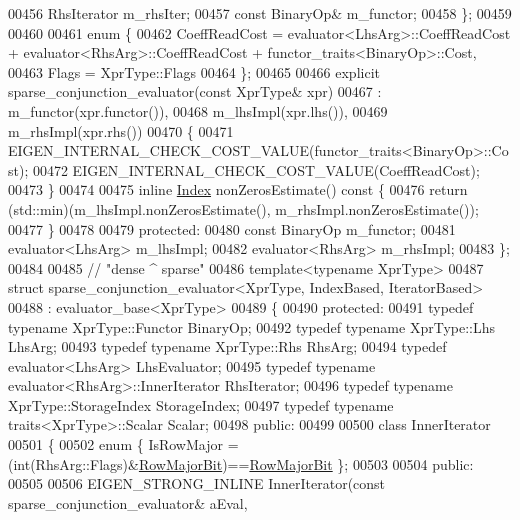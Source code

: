 \begin{DoxyCode}
00456     RhsIterator m\_rhsIter;
00457     \textcolor{keyword}{const} BinaryOp& m\_functor;
00458   \};
00459   
00460   
00461   \textcolor{keyword}{enum} \{
00462     CoeffReadCost = evaluator<LhsArg>::CoeffReadCost + evaluator<RhsArg>::CoeffReadCost + 
      functor\_traits<BinaryOp>::Cost,
00463     Flags = XprType::Flags
00464   \};
00465   
00466   \textcolor{keyword}{explicit} sparse\_conjunction\_evaluator(\textcolor{keyword}{const} XprType& xpr)
00467     : m\_functor(xpr.functor()),
00468       m\_lhsImpl(xpr.lhs()), 
00469       m\_rhsImpl(xpr.rhs())  
00470   \{
00471     EIGEN\_INTERNAL\_CHECK\_COST\_VALUE(functor\_traits<BinaryOp>::Cost);
00472     EIGEN\_INTERNAL\_CHECK\_COST\_VALUE(CoeffReadCost);
00473   \}
00474   
00475   \textcolor{keyword}{inline} \hyperlink{namespace_eigen_a62e77e0933482dafde8fe197d9a2cfde}{Index} nonZerosEstimate()\textcolor{keyword}{ const }\{
00476     \textcolor{keywordflow}{return} (std::min)(m\_lhsImpl.nonZerosEstimate(), m\_rhsImpl.nonZerosEstimate());
00477   \}
00478 
00479 \textcolor{keyword}{protected}:
00480   \textcolor{keyword}{const} BinaryOp m\_functor;
00481   evaluator<LhsArg> m\_lhsImpl;
00482   evaluator<RhsArg> m\_rhsImpl;
00483 \};
00484 
00485 \textcolor{comment}{// "dense ^ sparse"}
00486 \textcolor{keyword}{template}<\textcolor{keyword}{typename} XprType>
00487 \textcolor{keyword}{struct }sparse\_conjunction\_evaluator<XprType, IndexBased, IteratorBased>
00488   : evaluator\_base<XprType>
00489 \{
00490 \textcolor{keyword}{protected}:
00491   \textcolor{keyword}{typedef} \textcolor{keyword}{typename} XprType::Functor BinaryOp;
00492   \textcolor{keyword}{typedef} \textcolor{keyword}{typename} XprType::Lhs LhsArg;
00493   \textcolor{keyword}{typedef} \textcolor{keyword}{typename} XprType::Rhs RhsArg;
00494   \textcolor{keyword}{typedef} evaluator<LhsArg> LhsEvaluator;
00495   \textcolor{keyword}{typedef} \textcolor{keyword}{typename} evaluator<RhsArg>::InnerIterator  RhsIterator;
00496   \textcolor{keyword}{typedef} \textcolor{keyword}{typename} XprType::StorageIndex StorageIndex;
00497   \textcolor{keyword}{typedef} \textcolor{keyword}{typename} traits<XprType>::Scalar Scalar;
00498 \textcolor{keyword}{public}:
00499 
00500   \textcolor{keyword}{class }InnerIterator
00501   \{
00502     \textcolor{keyword}{enum} \{ IsRowMajor = (int(RhsArg::Flags)&\hyperlink{group__flags_gae4f56c2a60bbe4bd2e44c5b19cbe8762}{RowMajorBit})==\hyperlink{group__flags_gae4f56c2a60bbe4bd2e44c5b19cbe8762}{RowMajorBit} \};
00503 
00504   \textcolor{keyword}{public}:
00505     
00506     EIGEN\_STRONG\_INLINE InnerIterator(\textcolor{keyword}{const} sparse\_conjunction\_evaluator& aEval, 

\end{DoxyCode}
